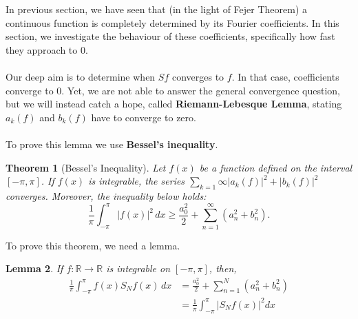 \documentclass[12pt]{amsart}
\newtheorem{theorem}{Theorem}[section]
\newtheorem{lemma}[theorem]{Lemma}
\theoremstyle{definition}
\begin{document}
In previous section, we have seen that (in the light of Fejer Theorem) a continuous function is completely determined by its Fourier coefficients\footnotemark{}. In this section, we investigate the behaviour of these coefficients, specifically how fast they approach to $0$. \paragraph{}
    Our deep aim is to determine when $Sf$ converges to $f$. In that case, coefficients converge to 0. Yet, we are not able to answer the general convergence question, but we will instead catch a hope, called \textbf{Riemann-Lebesque Lemma}, stating $a_k(f)$ and $b_k(f)$ have to converge to zero. \paragraph{}
    To prove this lemma we use \textbf{Bessel's inequality}.


\begin{theorem}[Bessel's Inequality]
Let $f(x)$ be a function defined on the interval $[-\pi, \pi]$. If $f(x)$ is integrable, the series $\sum_{k=1}{\infty}|a_k(f)|^2 + |b_k(f)|^2$ converges. Moreover, the inequality below holds:
\begin{equation}
    \frac{1}{\pi} \int_{-\pi}^{\pi} |f(x)|^2 \, dx \geq \frac{a_0^2}{2} + \sum_{n=1}^{\infty} \left(a_n^2 + b_n^2\right).
\end{equation}
\end{theorem}


 To prove this theorem, we need a lemma.


 \begin{lemma}
     If $f: \mathbb{R} \to \mathbb{R}$ is integrable on $[-\pi, \pi]$, then,
     \begin{equation}
     \begin{aligned}
         \frac{1}{\pi} \int_{-\pi}^{\pi} f(x)S_Nf(x) \, dx
         &= \frac{a_0^2}{2} + \sum_{n=1}^{N} \left(a_n^2 +
         b_n^2\right)\\
         &=  \frac{1}{\pi} \int_{-\pi}^{\pi} |S_Nf(x)|^2  dx
     \end{aligned}
     \end{equation}
 \end{lemma}
\end{document}
